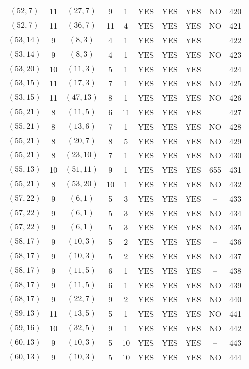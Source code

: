 \begin{longtable}{|c|c|c|c|c|c|c|c|c|c|}
$(52, 7)$ & 11 & $(27, 7)$ & 9 & 1 & YES & YES & YES & NO & 420\\
$(52, 7)$ & 11 & $(36, 7)$ & 11 & 4 & YES & YES & YES & NO & 421\\
$(53, 14)$ & 9 & $(8, 3)$ & 4 & 1 & YES & YES & YES & -- & 422\\
$(53, 14)$ & 9 & $(8, 3)$ & 4 & 1 & YES & YES & YES & NO & 423\\
$(53, 20)$ & 10 & $(11, 3)$ & 5 & 1 & YES & YES & YES & -- & 424\\
$(53, 15)$ & 11 & $(17, 3)$ & 7 & 1 & YES & YES & YES & NO & 425\\
$(53, 15)$ & 11 & $(47, 13)$ & 8 & 1 & YES & YES & YES & NO & 426\\
$(55, 21)$ & 8 & $(11, 5)$ & 6 & 11 & YES & YES & YES & -- & 427\\
$(55, 21)$ & 8 & $(13, 6)$ & 7 & 1 & YES & YES & YES & NO & 428\\
$(55, 21)$ & 8 & $(20, 7)$ & 8 & 5 & YES & YES & YES & NO & 429\\
$(55, 21)$ & 8 & $(23, 10)$ & 7 & 1 & YES & YES & YES & NO & 430\\
$(55, 13)$ & 10 & $(51, 11)$ & 9 & 1 & YES & YES & YES & 655 & 431\\
$(55, 21)$ & 8 & $(53, 20)$ & 10 & 1 & YES & YES & YES & NO & 432\\
$(57, 22)$ & 9 & $(6, 1)$ & 5 & 3 & YES & YES & YES & -- & 433\\
$(57, 22)$ & 9 & $(6, 1)$ & 5 & 3 & YES & YES & YES & NO & 434\\
$(57, 22)$ & 9 & $(6, 1)$ & 5 & 3 & YES & YES & YES & NO & 435\\
$(58, 17)$ & 9 & $(10, 3)$ & 5 & 2 & YES & YES & YES & -- & 436\\
$(58, 17)$ & 9 & $(10, 3)$ & 5 & 2 & YES & YES & YES & NO & 437\\
$(58, 17)$ & 9 & $(11, 5)$ & 6 & 1 & YES & YES & YES & -- & 438\\
$(58, 17)$ & 9 & $(11, 5)$ & 6 & 1 & YES & YES & YES & NO & 439\\
$(58, 17)$ & 9 & $(22, 7)$ & 9 & 2 & YES & YES & YES & NO & 440\\
$(59, 13)$ & 11 & $(13, 5)$ & 5 & 1 & YES & YES & YES & NO & 441\\
$(59, 16)$ & 10 & $(32, 5)$ & 9 & 1 & YES & YES & YES & NO & 442\\
$(60, 13)$ & 9 & $(10, 3)$ & 5 & 10 & YES & YES & YES & -- & 443\\
$(60, 13)$ & 9 & $(10, 3)$ & 5 & 10 & YES & YES & YES & NO & 444\\

\end{longtable}
